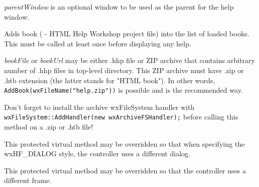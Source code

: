 {\it parentWindow} is an optional window to be used as the parent for the help window.

\label{wxhtmlhelpcontrolleraddbook}



Adds book ( - HTML Help Workshop project file) into the list of loaded books.
This must be called at least once before displaying  any help.

{\it bookFile} or {\it bookUrl}  may be either .hhp file or ZIP archive
that contains arbitrary number of .hhp files in 
top-level directory. This ZIP archive must have .zip or .htb extension
(the latter stands for "HTML book"). In other words, {\tt AddBook(wxFileName("help.zip"))} 
is possible and is the recommended way.




Don't forget to install the archive wxFileSystem handler with
{\tt wxFileSystem::AddHandler(new wxArchiveFSHandler);} before calling this method
on a .zip or .htb file!

\label{wxhtmlhelpcontrollercreatehelpdialog}


This protected virtual method may be overridden so that when specifying the wxHF\_DIALOG style, the controller
uses a different dialog.

\label{wxhtmlhelpcontrollercreatehelpframe}


This protected virtual method may be overridden so that the controller
uses a different frame.

